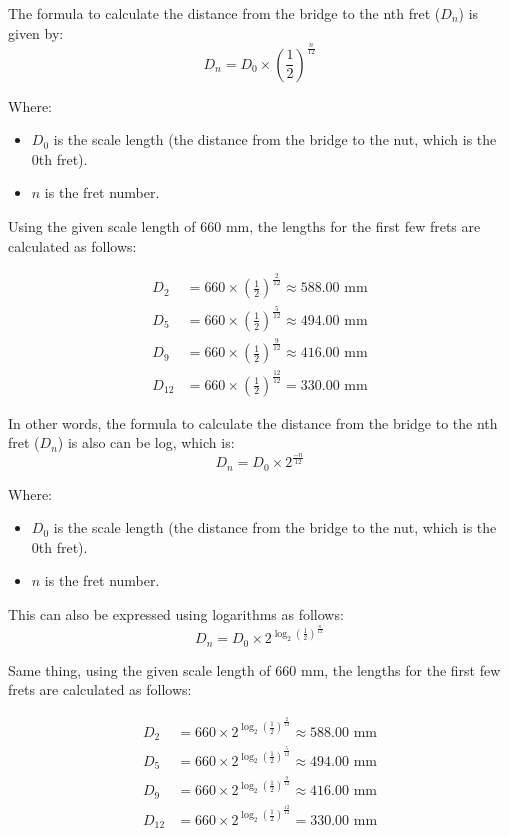\documentclass{article}
\newenvironment{solution}{\color{solutioncolor}}{}
\begin{document}
\begin{solution}
The formula to calculate the distance from the bridge to the nth fret (\(D_n\)) is given by:
\[ D_n = D_0 \times \left(\frac{1}{2}\right)^{\frac{n}{12}} \]

Where:
\begin{itemize}
  \item \(D_0\) is the scale length (the distance from the bridge to the nut, which is the 0th fret).
  \item \(n\) is the fret number.
\end{itemize}

Using the given scale length of 660 mm, the lengths for the first few frets are calculated as follows:

\begin{align*}
D_2 &= 660 \times \left(\frac{1}{2}\right)^{\frac{2}{12}} \approx 588.00 \text{ mm} \\
D_5 &= 660 \times \left(\frac{1}{2}\right)^{\frac{5}{12}} \approx 494.00 \text{ mm} \\
D_9 &= 660 \times \left(\frac{1}{2}\right)^{\frac{9}{12}} \approx 416.00 \text{ mm} \\
D_{12} &= 660 \times \left(\frac{1}{2}\right)^{\frac{12}{12}} = 330.00 \text{ mm}
\end{align*}

In other words, the formula to calculate the distance from the bridge to the nth fret (\(D_n\)) is also can be log, which is:
\[ D_n = D_0 \times 2^{\frac{-n}{12}} \]

Where:
\begin{itemize}
  \item \(D_0\) is the scale length (the distance from the bridge to the nut, which is the 0th fret).
  \item \(n\) is the fret number.
\end{itemize}

This can also be expressed using logarithms as follows:
\[ D_n = D_0 \times 2^{\log_{2}\left(\frac{1}{2}\right)^{\frac{n}{12}}} \]

Same thing, using the given scale length of 660 mm, the lengths for the first few frets are calculated as follows:

\begin{align*}
D_2 &= 660 \times 2^{\log_{2}\left(\frac{1}{2}\right)^{\frac{2}{12}}} \approx 588.00 \text{ mm} \\
D_5 &= 660 \times 2^{\log_{2}\left(\frac{1}{2}\right)^{\frac{5}{12}}} \approx 494.00 \text{ mm} \\
D_9 &= 660 \times 2^{\log_{2}\left(\frac{1}{2}\right)^{\frac{9}{12}}} \approx 416.00 \text{ mm} \\
D_{12} &= 660 \times 2^{\log_{2}\left(\frac{1}{2}\right)^{\frac{12}{12}}} = 330.00 \text{ mm}
\end{align*}
\end{solution}
\end{document}
